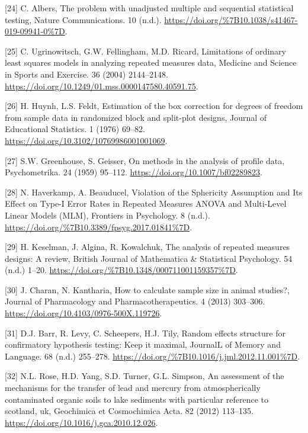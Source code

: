\documentclass[
]{article}
\begin{document}
\leavevmode\hypertarget{ref-albers2019}{}%
{[}24{]} C. Albers, The problem with unadjusted multiple and sequential statistical testing, Nature Communications. 10 (n.d.). \url{https://doi.org/\%7B10.1038/s41467-019-09941-0\%7D}.

\leavevmode\hypertarget{ref-ugrinowitsch2004}{}%
{[}25{]} C. Ugrinowitsch, G.W. Fellingham, M.D. Ricard, Limitations of ordinary least squares models in analyzing repeated measures data, Medicine and Science in Sports and Exercise. 36 (2004) 2144--2148. \url{https://doi.org/10.1249/01.mss.0000147580.40591.75}.

\leavevmode\hypertarget{ref-huynh1976}{}%
{[}26{]} H. Huynh, L.S. Feldt, Estimation of the box correction for degrees of freedom from sample data in randomized block and split-plot designs, Journal of Educational Statistics. 1 (1976) 69--82. \url{https://doi.org/10.3102/10769986001001069}.

\leavevmode\hypertarget{ref-greenhouse1959}{}%
{[}27{]} S.W. Greenhouse, S. Geisser, On methods in the analysis of profile data, Psychometrika. 24 (1959) 95--112. \url{https://doi.org/10.1007/bf02289823}.

\leavevmode\hypertarget{ref-haverkamp2017}{}%
{[}28{]} N. Haverkamp, A. Beauducel, Violation of the Sphericity Assumption and Its Effect on Type-I Error Rates in Repeated Measures ANOVA and Multi-Level Linear Models (MLM), Frontiers in Psychology. 8 (n.d.). \url{https://doi.org/\%7B10.3389/fpsyg.2017.01841\%7D}.

\leavevmode\hypertarget{ref-keselman2001}{}%
{[}29{]} H. Keselman, J. Algina, R. Kowalchuk, The analysis of repeated measures designs: A review, British Journal of Mathematica \& Statistical Psychology. 54 (n.d.) 1--20. \url{https://doi.org/\%7B10.1348/000711001159357\%7D}.

\leavevmode\hypertarget{ref-charan2013}{}%
{[}30{]} J. Charan, N. Kantharia, How to calculate sample size in animal studies?, Journal of Pharmacology and Pharmacotherapeutics. 4 (2013) 303--306. \url{https://doi.org/10.4103/0976-500X.119726}.

\leavevmode\hypertarget{ref-barr2013}{}%
{[}31{]} D.J. Barr, R. Levy, C. Scheepers, H.J. Tily, Random effects structure for confirmatory hypothesis testing: Keep it maximal, JournalL of Memory and Language. 68 (n.d.) 255--278. \url{https://doi.org/\%7B10.1016/j.jml.2012.11.001\%7D}.

\leavevmode\hypertarget{ref-rose2012}{}%
{[}32{]} N.L. Rose, H.D. Yang, S.D. Turner, G.L. Simpson, An assessment of the mechanisms for the transfer of lead and mercury from atmospherically contaminated organic soils to lake sediments with particular reference to scotland, uk, Geochimica et Cosmochimica Acta. 82 (2012) 113--135. \url{https://doi.org/10.1016/j.gca.2010.12.026}.
\end{document}
